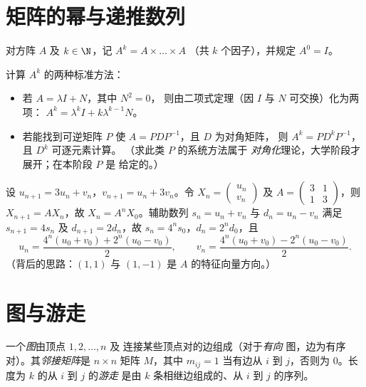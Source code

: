 \section{矩阵的幂与递推数列}

\begin{definition}\label{def:g12:matrix:power}
对方阵 $A$ 及 $k \in \N$，记 $A^k = A \times \dots \times A$
（共 $k$ 个因子），并规定 $A^0 = I$。
\end{definition}

\begin{method}[数量矩阵加幂零矩阵及可对角化的情形]\label{met:g12:matrix:powers}
计算 $A^k$ 的两种标准方法：
\begin{itemize}
  \item 若 $A = \lambda I + N$，其中 $N^2 = 0$，
        则由二项式定理（因 $I$ 与 $N$ 可交换）化为两项：
        $A^k = \lambda^k I + k \lambda^{k-1} N$。
  \item 若能找到可逆矩阵 $P$ 使 $A = PDP^{-1}$，且 $D$ 为对角矩阵，
        则 $A^k = P D^k P^{-1}$，且 $D^k$ 可逐元素计算。
        （求此类 $P$ 的系统方法属于
        \emph{对角化}理论，大学阶段才展开；在本阶段 $P$ 是
        给定的。）
\end{itemize}
\end{method}

\begin{example}[耦合数列]\label{ex:g12:matrix:coupled}
设 $u_{n+1} = 3u_n + v_n$，$v_{n+1} = u_n + 3v_n$。令
$X_n = \begin{pmatrix} u_n\\ v_n \end{pmatrix}$ 及
$A = \begin{pmatrix} 3 & 1\\ 1 & 3\end{pmatrix}$，则
$X_{n+1} = AX_n$，故 $X_n = A^n X_0$。辅助数列
$s_n = u_n + v_n$ 与 $d_n = u_n - v_n$ 满足 $s_{n+1} = 4s_n$ 及
$d_{n+1} = 2d_n$，故 $s_n = 4^n s_0$，$d_n = 2^n d_0$，且
\[
u_n = \frac{4^n(u_0+v_0) + 2^n(u_0-v_0)}{2}, \qquad
v_n = \frac{4^n(u_0+v_0) - 2^n(u_0-v_0)}{2}.
\]
（背后的思路：$(1,1)$ 与 $(1,-1)$ 是 $A$ 的特征向量方向。）
\end{example}

\section{图与游走}

\begin{definition}[图、邻接矩阵]\label{def:g12:matrix:graph}
一个\emph{图}由顶点 $1, 2, \dots, n$ 及
连接某些顶点对的边组成（对于\emph{有向}
图，边为有序对）。其\emph{邻接矩阵}是
$n \times n$ 矩阵 $M$，其中 $m_{ij} = 1$ 当有边从 $i$ 到
$j$，否则为 $0$。长度为 $k$ 的从 $i$ 到 $j$ 的\emph{游走}
是由 $k$ 条相继边组成的、从 $i$ 到 $j$ 的序列。
\end{definition}

